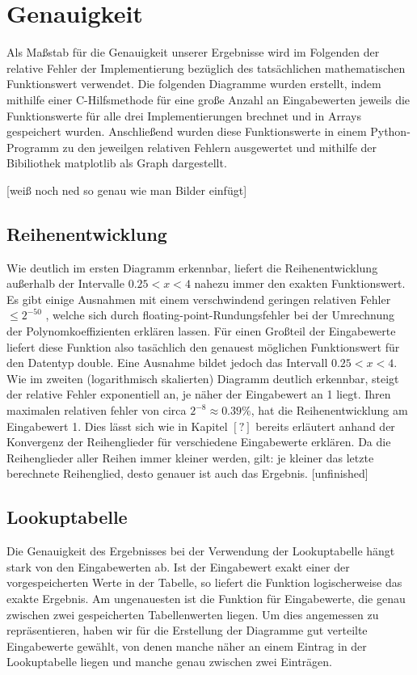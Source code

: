 \documentclass[course=erap] {aspdoc}
\begin{document}
     \section{Genauigkeit}
     Als Maßstab für die Genauigkeit unserer Ergebnisse wird im Folgenden der relative Fehler der Implementierung bezüglich des tatsächlichen mathematischen Funktionswert verwendet. Die folgenden Diagramme wurden erstellt, indem mithilfe einer C-Hilfsmethode für eine große Anzahl an Eingabewerten jeweils die Funktionswerte für alle drei Implementierungen brechnet und in Arrays gespeichert wurden. Anschließend wurden diese Funktionswerte in einem Python-Programm zu den jeweilgen relativen Fehlern ausgewertet und mithilfe der Bibiliothek matplotlib als Graph dargestellt.
 
     [weiß noch ned so genau wie man Bilder einfügt]
     
     \subsection{Reihenentwicklung}
     Wie deutlich im ersten Diagramm erkennbar, liefert die Reihenentwicklung außerhalb der Intervalle $0.25<x<4$ nahezu immer den exakten Funktionswert. Es gibt einige Ausnahmen mit einem verschwindend geringen relativen Fehler $\leq2^{-50}$ , welche sich durch floating-point-Rundungsfehler bei der Umrechnung der Polynomkoeffizienten erklären lassen.
     Für einen Großteil der Eingabewerte liefert diese Funktion also tasächlich den genauest möglichen Funktionswert für den Datentyp double. Eine Ausnahme bildet jedoch das Intervall $0.25<x<4$. Wie im zweiten (logarithmisch skalierten) Diagramm deutlich erkennbar, steigt der relative Fehler exponentiell an, je näher der Eingabewert an 1 liegt. Ihren maximalen relativen fehler von circa $2^{-8} \approx 0.39\%$, hat die Reihenentwicklung am Eingabewert 1. Dies lässt sich wie in Kapitel $[?]$ bereits erläutert anhand der Konvergenz der Reihenglieder für verschiedene Eingabewerte erklären. Da die Reihenglieder aller Reihen immer kleiner werden, gilt: je kleiner das letzte berechnete Reihenglied, desto genauer ist auch das Ergebnis. [unfinished]
     
     \subsection{Lookuptabelle}
     Die Genauigkeit des Ergebnisses bei der Verwendung der Lookuptabelle hängt stark von den Eingabewerten ab. Ist der Eingabewert exakt einer der vorgespeicherten Werte in der Tabelle, so liefert die Funktion logischerweise das exakte Ergebnis. Am ungenauesten ist die Funktion für Eingabewerte, die genau zwischen zwei gespeicherten Tabellenwerten liegen. Um dies angemessen zu repräsentieren, haben wir für die Erstellung der Diagramme gut verteilte Eingabewerte gewählt, von denen manche näher an einem Eintrag in der Lookuptabelle liegen und manche genau zwischen zwei Einträgen.  
     
\end{document}
